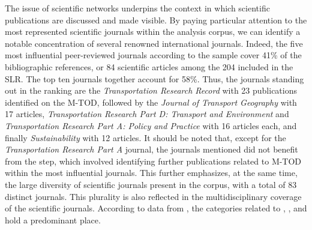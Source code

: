 \begin{refsegment}
The issue of scientific networks underpins the context in which scientific publications are discussed and made visible. By paying particular attention to the most represented scientific journals within the analysis corpus, we can identify a notable concentration of several renowned international journals. Indeed, the five most influential peer-reviewed journals according to the sample cover 41\% of the bibliographic references, or 84 scientific articles among the 204 included in the \acrshort{SLR}. The top ten journals together account for 58\%. Thus, the journals standing out in the ranking are the \textsl{Transportation Research Record} with 23 publications identified on the \acrshort{M-TOD}, followed by the \textsl{Journal of Transport Geography} with 17 articles, \foreignlanguage{english}{\textsl{Transportation Research Part D: Transport and Environment}} and \foreignlanguage{english}{\textsl{Transportation Research Part A: Policy and Practice}} with 16 articles each, and finally \textsl{Sustainability} with 12 articles. It should be noted that, except for the \textsl{Transportation Research Part A} journal, the journals mentioned did not benefit from the  step, which involved identifying further publications related to \acrshort{M-TOD} within the most influential journals. This further emphasizes, at the same time, the large diversity of scientific journals present in the corpus, with a total of 83 distinct journals. This plurality is also reflected in the multidisciplinary coverage of the scientific journals. According to data from , the categories related to , , and  hold a predominant place.%


\end{refsegment}
